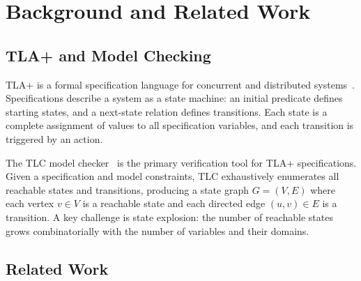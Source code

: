 \documentclass[conference]{IEEEtran}
\begin{document}
\section{Background and Related Work}

\subsection{TLA+ and Model Checking}

TLA+ is a formal specification language for concurrent and distributed systems~\cite{lamport2003specifying}. Specifications describe a system as a state machine: an initial predicate defines starting states, and a next-state relation defines transitions. Each state is a complete assignment of values to all specification variables, and each transition is triggered by an action.

The TLC model checker~\cite{yuan1999model} is the primary verification tool for TLA+ specifications. Given a specification and model constraints, TLC exhaustively enumerates all reachable states and transitions, producing a state graph $G = (V, E)$ where each vertex $v \in V$ is a reachable state and each directed edge $(u, v) \in E$ is a transition. A key challenge is state explosion: the number of reachable states grows combinatorially with the number of variables and their domains.

\subsection{Related Work}

\end{document}
